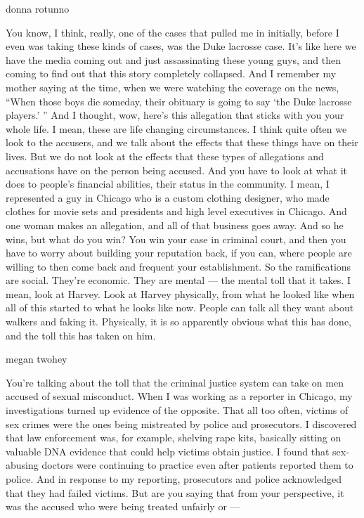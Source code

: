 donna rotunno

You know, I think, really, one of the cases that pulled me in initially,
before I even was taking these kinds of cases, was the Duke lacrosse
case. It's like here we have the media coming out and just assassinating
these young guys, and then coming to find out that this story completely
collapsed. And I remember my mother saying at the time, when we were
watching the coverage on the news, ``When those boys die someday, their
obituary is going to say `the Duke lacrosse players.' '' And I thought,
wow, here's this allegation that sticks with you your whole life. I
mean, these are life changing circumstances. I think quite often we look
to the accusers, and we talk about the effects that these things have on
their lives. But we do not look at the effects that these types of
allegations and accusations have on the person being accused. And you
have to look at what it does to people's financial abilities, their
status in the community. I mean, I represented a guy in Chicago who is a
custom clothing designer, who made clothes for movie sets and presidents
and high level executives in Chicago. And one woman makes an allegation,
and all of that business goes away. And so he wins, but what do you win?
You win your case in criminal court, and then you have to worry about
building your reputation back, if you can, where people are willing to
then come back and frequent your establishment. So the ramifications are
social. They're economic. They are mental --- the mental toll that it
takes. I mean, look at Harvey. Look at Harvey physically, from what he
looked like when all of this started to what he looks like now. People
can talk all they want about walkers and faking it. Physically, it is so
apparently obvious what this has done, and the toll this has taken on
him.

megan twohey

You're talking about the toll that the criminal justice system can take
on men accused of sexual misconduct. When I was working as a reporter in
Chicago, my investigations turned up evidence of the opposite. That all
too often, victims of sex crimes were the ones being mistreated by
police and prosecutors. I discovered that law enforcement was, for
example, shelving rape kits, basically sitting on valuable DNA evidence
that could help victims obtain justice. I found that sex-abusing doctors
were continuing to practice even after patients reported them to police.
And in response to my reporting, prosecutors and police acknowledged
that they had failed victims. But are you saying that from your
perspective, it was the accused who were being treated unfairly or ---

